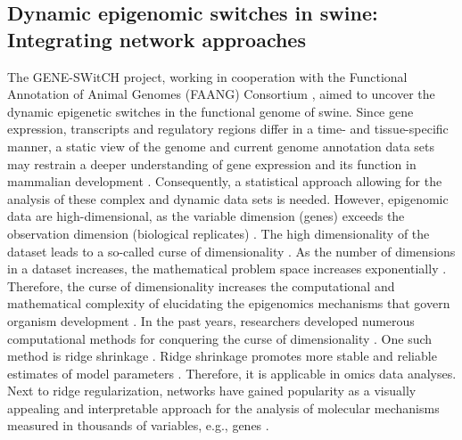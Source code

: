 \documentclass[
	a4paper, %
	10pt, %
	unnumberedsections, %
	twoside, %
]{LTJournalArticle}
\begin{document}
\subsection{\normalsize Dynamic epigenomic switches in swine: Integrating network approaches} 
The GENE-SWitCH project, working in cooperation with the Functional Annotation of 
Animal Genomes (FAANG) 
Consortium \autocite{giuffra2019a}, aimed to uncover the dynamic epigenetic switches 
in the functional genome of swine.
Since gene expression, transcripts and regulatory regions differ in a time- and 
tissue-specific manner, a static view of 
the genome and current genome annotation data sets may restrain a deeper understanding 
of gene expression 
and its function in mammalian development \autocite{acloque2022a}. 
Consequently, a statistical approach allowing for the analysis of these complex 
and dynamic data sets is needed. However, epigenomic data are high-dimensional, 
as the variable dimension (genes) exceeds the 
observation dimension (biological replicates) \autocite{mirza2019a}. 
The high dimensionality of the dataset leads to a so-called curse of 
dimensionality \autocite{donoho2000a}. As the number of dimensions in 
a dataset increases, the mathematical problem space increases 
exponentially \autocite{phan2012a}. Therefore, the curse of dimensionality 
increases the computational and mathematical complexity of 
elucidating the epigenomics mechanisms that govern organism development 
\autocite{donoho2000a}. In the past years, researchers developed 
numerous computational methods for conquering the curse of dimensionality 
\autocite{donoho2000a}. One such method is ridge shrinkage \autocite{ogutu2012a}. Ridge 
shrinkage promotes more stable and reliable estimates of model parameters 
\autocite{wieringen-a}. Therefore, it is applicable in omics 
data analyses. Next to ridge regularization, networks have gained popularity 
as a visually appealing and interpretable 
approach for the analysis of molecular mechanisms measured in thousands of 
variables, e.g., genes \autocite{bodein2022a}.
\end{document}
